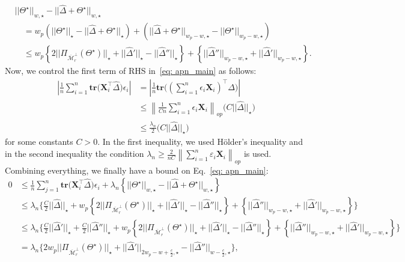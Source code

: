 \documentclass[12pt]{article}
\begin{document}
\begin{align}
    &||\Theta^{\star}||_{w,\star} - ||\widehat{\Delta} + \Theta^{\star}||_{w,\star} \nonumber \\
    &\quad =   w_{p}(||\Theta^{\star}||_{\star} - ||\widehat{\Delta} + \Theta^{\star}||_{\star}) + (||\widehat{\Delta} + \Theta^{\star}||_{w_{p}-w,\star} - ||\Theta^{\star}||_{w_{p}-w,\star} )  \nonumber\\ 
    &\quad \leq  w_{p}\left\lbrace 2||\Pi_{\overline{\mathcal{M}}_{r}^{\perp}}(\Theta^{\star})||_{\star} + ||\widehat{\Delta}'||_{\star} - ||\widehat{\Delta}''||_{\star}  \right\rbrace + \left\lbrace ||\widehat{\Delta}''||_{w_{p} - w, \star}  + ||\widehat{\Delta}'||_{w_{p} - w, \star}\right\rbrace.\nonumber
\end{align}
Now, we control the first term of RHS in~\eqref{eq: apn_main} as follows:
\begin{align} 
    \left| \frac{1}{n}\sum^{n}_{i=1}\textbf{tr}\big(\mathbf{X}_{i}^{\top}\widehat{\Delta}\big)\epsilon_{i}  \right| 
    &=\left|\frac{1}{n}\textbf{tr}\Bigg( \left(\sum^{n}_{i=1}\epsilon_{i}\mathbf{X}_{i}\right)^{\top}\widehat{\Delta} \Bigg) \right| \nonumber \\
    &\leq \left\|\frac{1}{ C n} \sum^{n}_{i=1}\epsilon_{i}\mathbf{X}_{i}\right\|_{op} \bigg( C ||\widehat{\Delta}||_{\star} \bigg) \nonumber \\ 
    & \leq  \frac{\lambda_{n}}{2}  \bigg( C ||\widehat{\Delta}||_{\star} \bigg)
    \label{holder_ineq}
\end{align}
for some constants $C > 0$.
In the first inequality, we used H\"older's inequality and in the second inequality 
the condition $\lambda_{n}\geq\frac{2}{nC}\left\|\sum_{i=1}^{n}\varepsilon_{i}\mathbf{X}_{i}\right\|_{op}$ is used.
Combining everything, we finally have a bound on Eq.~\eqref{eq: apn_main}:
\begin{align}
    0  & \leq \frac{1}{n}\sum^{n}_{j=1}\mathbf{tr}\big(\mathbf{X}_{i}^{\top}\widehat{\Delta}\big)\epsilon_{i} + \lambda_{n}\left\lbrace||\Theta^{\star}||_{w, \star} - ||\widehat{\Delta} + \Theta^{\star}||_{w, \star}\right\rbrace \nonumber\\
    & \leq \lambda_{n} \Bigg\{ \frac{C}{2}||\widehat{\Delta}||_{\star} + w_{p}\left\lbrace 2||\Pi_{\overline{\mathcal{M}}_{r}^{\perp}}(\Theta^{\star})||_{\star} + ||\widehat{\Delta}'||_{\star} - ||\widehat{\Delta}''||_{\star}  \right\rbrace + \left\lbrace ||\widehat{\Delta}''||_{w_{p} - w, \star}  + ||\widehat{\Delta}'||_{w_{p} - w, \star}\right\rbrace \Bigg\} \nonumber\\
    & \leq \lambda_{n} \Bigg\{ \frac{C}{2}||\widehat{\Delta}'||_{\star} + \frac{C}{2}||\widehat{\Delta}''||_{\star} + w_{p}\left\lbrace 2||\Pi_{\overline{\mathcal{M}}_{r}^{\perp}}(\Theta^{\star})||_{\star} + ||\widehat{\Delta}'||_{\star} - ||\widehat{\Delta}''||_{\star}  \right\rbrace + \left\lbrace ||\widehat{\Delta}''||_{w_{p} - w, \star}  + ||\widehat{\Delta}'||_{w_{p} - w, \star}\right\rbrace \Bigg\} \nonumber\\
    &= \lambda_{n} \Bigg\{ 2w_{p}||\Pi_{\overline{\mathcal{M}}_{r}^{\perp}}(\Theta^{\star})||_{\star} +  ||\widehat{\Delta}'||_{2w_{p}-w+\frac{c}{2}, \star} - ||\widehat{\Delta}''||_{w - \frac{c}{2},\star} \Bigg\}, \label{eq: pre_new_main}
\end{align}
\end{document}
